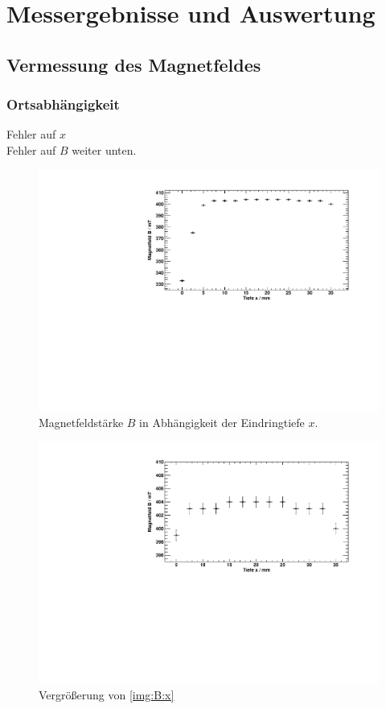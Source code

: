 \section{Messergebnisse und Auswertung}
\subsection{Vermessung des Magnetfeldes}
\subsubsection{Ortsabhängigkeit}
Fehler auf $x$ \\
Fehler auf $B$ weiter unten.
\begin{figure}[H]
\begin{center}
  \includegraphics[width=\textwidth]{../img/01-B-x.pdf}
  \caption{Magnetfeldstärke $B$ in Abhängigkeit der Eindringtiefe $x$.}
  \label{img:B:x}
\end{center}
\end{figure}
\begin{figure}[H]
\begin{center}
  \includegraphics[width=\textwidth]{../img/01-B-x-zoom.pdf}
  \caption{Vergrößerung von \autoref{img:B:x}}
  \label{img:B:x:zoom}
\end{center}
\end{figure}

